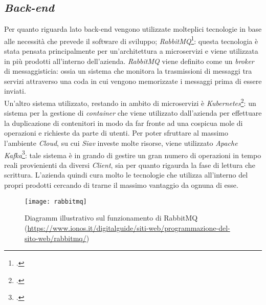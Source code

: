 \subsection{\textit{Back-end}}
Per quanto riguarda lato back-end vengono utilizzate molteplici tecnologie in base alle necessità che prevede il software di sviluppo;  \textit{RabbitMQ}\footcite{RabbitMQ: https://www.rabbitmq.com/}: questa tecnologia è stata pensata principalmente per un'architettura a microservizi e viene utilizzata in più prodotti all'interno dell'azienda. \textit{RabbitMQ} viene definito come un \textit{\gls{broker}} di messaggisticia: ossia un sistema che monitora la trasmissioni di messaggi tra servizi attraverso una coda in cui vengono memorizzate i messaggi prima di essere inviati.\\ Un'altro sistema utilizzato, restando in ambito di microservizi è \textit{Kubernetes}\footcite{Kubernetes: https://kubernetes.io/}: un sistema per la gestione di \textit{container} che viene utilizzato dall'azienda per effettuare la duplicazione di contenitori in modo da far fronte ad una cospicua mole di operazioni e richieste da parte di utenti. Per poter sfruttare al massimo l'ambiente \textit{Cloud}, su cui \textit{Siav} investe molte risorse, viene utilizzato \textit{Apache Kafka}\footcite{Apache Kafka: https://kafka.apache.org/}: tale sistema è in grando di gestire un gran numero di operazioni in tempo reali provienienti da diversi \textit{Client}, sia per quanto rigaurda la fase di lettura che scrittura. L'azienda quindi cura molto le tecnologie che utilizza all'interno del propri prodotti cercando di trarne il massimo vantaggio da ognuna di esse. 

\begin{figure}[!h] 
	\centering 
	\texttt{[image: rabbitmq]} 
	\caption{Diagramm illustrativo sul funzionamento di RabbitMQ
	(\url{https://www.ionos.it/digitalguide/siti-web/programmazione-del-sito-web/rabbitmq/})}
\end{figure}
